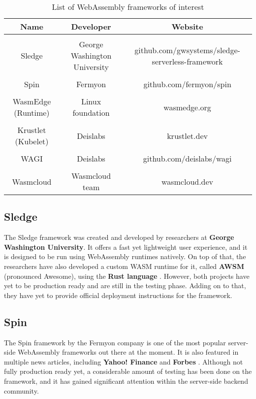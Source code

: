 \bigskip
\begin{table}[h!]
\centering
\begin{tabular}{||c c c||} 
\hline
Name & Developer & Website \\ [1ex] 
\hline\hline
 & & \\
Sledge & George Washington University & github.com/gwsystems/sledge-serverless-framework \\ 
 & & \\
Spin & Fermyon & github.com/fermyon/spin \\
 & & \\
WasmEdge (Runtime) & Linux foundation & wasmedge.org \\
 & & \\
Krustlet (Kubelet) & Deislabs & krustlet.dev \\
 & & \\
WAGI & Deislabs & github.com/deislabs/wagi \\
 & & \\
Wasmcloud & Wasmcloud team & wasmcloud.dev \\ [1ex]
\hline
\end{tabular}
\caption{List of WebAssembly frameworks of interest}
\label{table:webassembly_frameworks}
\end{table}

\bigskip
\subsection{Sledge}

The Sledge framework was created and developed by researchers at \textbf{George Washington University}. It offers a fast yet lightweight user experience, and it is designed to be run using WebAssembly runtimes natively. On top of that, the researchers have also developed a custom WASM runtime for it, called \textbf{AWSM} \cite{exp32} (pronounced Awesome), using the \textbf{Rust language} \cite{exp33}. However, both projects have yet to be production ready and are still in the testing phase. Adding on to that, they have yet to provide official deployment instructions for the framework.

\bigskip
\subsection{Spin}

The Spin framework by the Fermyon company is one of the most popular server-side WebAssembly frameworks out there at the moment. It is also featured in multiple news articles, including \textbf{Yahoo! Finance} \cite{exp34} and \textbf{Forbes} \cite{exp35}. Although not fully production ready yet, a considerable amount of testing has been done on the framework, and it has gained significant attention within the server-side backend community.

